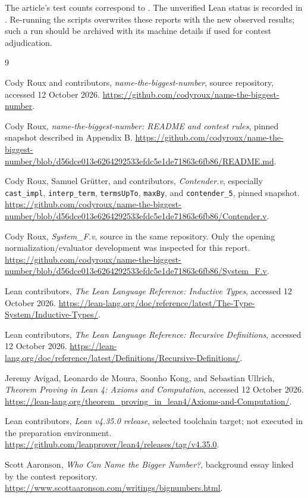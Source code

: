 \documentclass[11pt]{article}
\theoremstyle{definition}
\newcommand{\code}[1]{\texttt{#1}}
\begin{document}
The article's test counts correspond to
. The unverified Lean status is recorded
in . Re-running the scripts overwrites
these reports with the new observed results; such a run should be archived
with its machine details if used for contest adjudication.

\begin{thebibliography}{9}
\small\raggedright
{}
Cody Roux and contributors, \emph{name-the-biggest-number}, source repository,
accessed 12 October 2026.
\url{https://github.com/codyroux/name-the-biggest-number}.

Cody Roux, \emph{name-the-biggest-number: README and contest rules}, pinned
snapshot described in Appendix B.
\url{https://github.com/codyroux/name-the-biggest-number/blob/d56dce013e6264292533efdc5e1de71863c6fb86/README.md}.

Cody Roux, Samuel Gr\"utter, and contributors, \emph{Contender.v}, especially
\code{cast\_impl}, \code{interp\_term}, \code{termsUpTo}, \code{maxBy}, and
\code{contender\_5}, pinned snapshot.
\url{https://github.com/codyroux/name-the-biggest-number/blob/d56dce013e6264292533efdc5e1de71863c6fb86/Contender.v}.

Cody Roux, \emph{System\_F.v}, source in the same repository. Only the opening
normalization/evaluator development was inspected for this report.
\url{https://github.com/codyroux/name-the-biggest-number/blob/d56dce013e6264292533efdc5e1de71863c6fb86/System_F.v}.

Lean contributors, \emph{The Lean Language Reference: Inductive Types},
accessed 12 October 2026.
\url{https://lean-lang.org/doc/reference/latest/The-Type-System/Inductive-Types/}.

Lean contributors, \emph{The Lean Language Reference: Recursive Definitions},
accessed 12 October 2026.
\url{https://lean-lang.org/doc/reference/latest/Definitions/Recursive-Definitions/}.

Jeremy Avigad, Leonardo de Moura, Soonho Kong, and Sebastian Ullrich,
\emph{Theorem Proving in Lean 4: Axioms and Computation},
accessed 12 October 2026.
\url{https://lean-lang.org/theorem_proving_in_lean4/Axioms-and-Computation/}.

Lean contributors, \emph{Lean v4.35.0 release}, selected toolchain target;
not executed in the preparation environment.
\url{https://github.com/leanprover/lean4/releases/tag/v4.35.0}.

Scott Aaronson, \emph{Who Can Name the Bigger Number?}, background essay
linked by the contest repository.
\url{https://www.scottaaronson.com/writings/bignumbers.html}.
\end{thebibliography}
\end{document}
